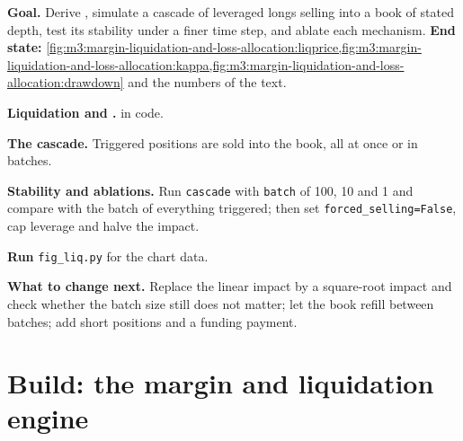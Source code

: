 \begin{tutorial}
\textbf{Goal.} Derive , simulate a cascade of leveraged longs selling into a book of stated depth, test
its stability under a finer time step, and ablate each mechanism. \textbf{End state:}
\cref{fig:m3:margin-liquidation-and-loss-allocation:liqprice,fig:m3:margin-liquidation-and-loss-allocation:kappa,fig:m3:margin-liquidation-and-loss-allocation:drawdown}
and the numbers of the text.
\begin{tutsteps}
\item \textbf{Liquidation and .}  in code.
\label{lst:m3:margin-liquidation-and-loss-allocation:liq}
\item \textbf{The cascade.} Triggered positions are sold into the book, all at once or in batches.
\label{lst:m3:margin-liquidation-and-loss-allocation:cascade}
\item \textbf{Stability and ablations.} Run \texttt{cascade} with \texttt{batch} of 100, 10 and 1 and compare with the
batch of everything triggered; then set \texttt{forced\_selling=False}, cap leverage and halve the impact.
\item \textbf{Run} \texttt{fig\_liq.py} for the chart data.
\end{tutsteps}
\textbf{What to change next.} Replace the linear impact by a square-root impact and check whether the batch size still
does not matter; let the book refill between batches; add short positions and a funding payment.
\end{tutorial}

\section{Build: the margin and liquidation engine}\label{bld:m3:margin-liquidation-and-loss-allocation:liquidation}

